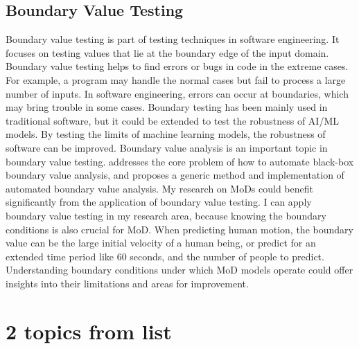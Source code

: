 \documentclass[11pt]{article}
\begin{document}
\subsection{Boundary Value Testing}
Boundary value testing is part of testing techniques in software engineering. It focuses on testing values that lie at the boundary edge of the input domain. Boundary value testing helps to find errors or bugs in code in the extreme cases. For example, a program may handle the normal cases but fail to process a large number of inputs. In software engineering, errors can occur at boundaries, which may bring trouble in some cases. Boundary testing has been mainly used in traditional software, but it could be extended to test the robustness of AI/ML models. By testing the limits of machine learning models, the robustness of software can be improved. Boundary value analysis is an important topic in boundary value testing. \cite{boundaryvaluetesting} addresses the core problem of how to automate black-box boundary value analysis, and proposes a generic method and implementation of automated boundary value analysis. My research on MoDs could benefit significantly from the application of boundary value testing. I can apply boundary value testing in my research area, because knowing the boundary conditions is also crucial for MoD. When predicting human motion, the boundary value can be the large initial velocity of a human being, or predict for an extended time period like 60 seconds, and the number of people to predict. Understanding boundary conditions under which MoD models operate could offer insights into their limitations and areas for improvement.


\section{2 topics from list}
\end{document}
